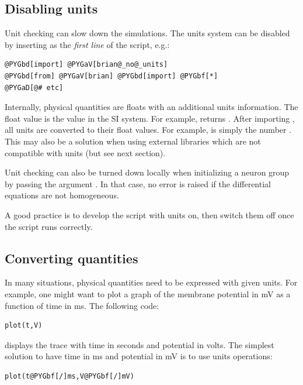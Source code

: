 \documentclass[letterpaper,10pt,english]{manual}
\begin{document}
\subsection{Disabling units}

Unit checking can slow down the simulations. The units system can be disabled by inserting
 as the \emph{first line} of the script, e.g.:

\begin{Verbatim}[commandchars=@\[\]]
@PYGbd[import] @PYGaV[brian@_no@_units]
@PYGbd[from] @PYGaV[brian] @PYGbd[import] @PYGbf[*]
@PYGaD[@# etc]
\end{Verbatim}

Internally, physical quantities are floats with an additional units information. The float
value is the value in the SI system. For example,  returns .
After importing , all units are converted to their float values. For example,
 is simply the number .
This may also be a solution when using external libraries which are not compatible with units
(but see next section).

Unit checking can also be turned down locally when initializing a neuron group by
passing the argument . In that case, no error is raised if the
differential equations are not homogeneous.

A good practice is to develop the script with units on, then switch them off once the script
runs correctly.


\subsection{Converting quantities}

In many situations, physical quantities need to be expressed with given units. For example,
one might want to plot a graph of the membrane potential in mV as a function of time in ms.
The following code:

\begin{Verbatim}[commandchars=@\[\]]
plot(t,V)
\end{Verbatim}

displays the trace with time in seconds and potential in volts. The simplest solution to have
time in ms and potential in mV is to use units operations:

\begin{Verbatim}[commandchars=@\[\]]
plot(t@PYGbf[/]ms,V@PYGbf[/]mV)
\end{Verbatim}
\end{document}
